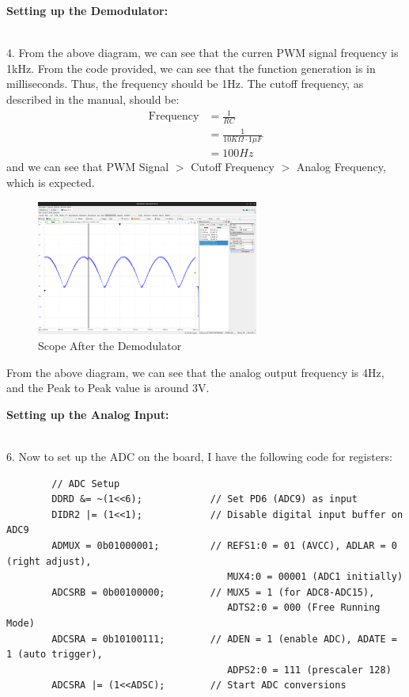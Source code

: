 \documentclass{report}
\begin{document}
    \begin{minipage}{\textwidth}
        \Large
        \textbf{Setting up the Demodulator:}
    \end{minipage}\\[0.5em]
    4. From the above diagram, we can see that the curren PWM signal frequency is 1kHz. From the code provided, we can see that the function generation is in milliseconds. Thus, the frequency should be 1Hz. The cutoff frequency, as described in the manual, should be:
    \begin{align*}
        \text{Frequency} &= \frac{1}{RC}\\
        &= \frac{1}{10K\Omega \cdot 1\mu F}\\
        &= 100Hz
    \end{align*}
    and we can see that PWM Signal $>$ Cutoff Frequency $>$ Analog Frequency, which is expected. 
    \begin{figure}[H]
        \centering
        \includegraphics[width = 0.65\textwidth]{scope4.png}
        \caption{Scope After the Demodulator}
    \end{figure}
    From the above diagram, we can see that the analog output frequency is 4Hz, and the Peak to Peak value is around 3V. \\[1em]
    \begin{minipage}{\textwidth}
        \Large
        \textbf{Setting up the Analog Input:}
    \end{minipage}\\[0.5em]
    6. Now to set up the ADC on the board, I have the following code for registers:
    \begin{verbatim}
        // ADC Setup
        DDRD &= ~(1<<6);            // Set PD6 (ADC9) as input
        DIDR2 |= (1<<1);            // Disable digital input buffer on ADC9
        ADMUX = 0b01000001;         // REFS1:0 = 01 (AVCC), ADLAR = 0 (right adjust), 
                                       MUX4:0 = 00001 (ADC1 initially)
        ADCSRB = 0b00100000;        // MUX5 = 1 (for ADC8-ADC15), 
                                       ADTS2:0 = 000 (Free Running Mode)
        ADCSRA = 0b10100111;        // ADEN = 1 (enable ADC), ADATE = 1 (auto trigger), 
                                       ADPS2:0 = 111 (prescaler 128)
        ADCSRA |= (1<<ADSC);        // Start ADC conversions
    \end{verbatim}
\end{document}
